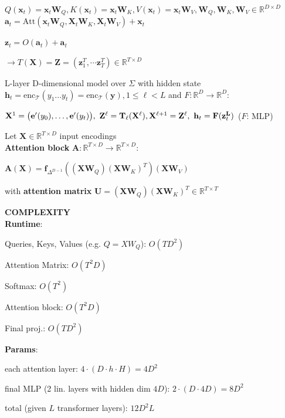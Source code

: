 $Q(\mathbf{x}_t) = \mathbf{x}_t \mathbf{W}_Q, K(\mathbf{x}_t) = \mathbf{x}_t \mathbf{W}_K, V(\mathbf{x}_t) = \mathbf{x}_t \mathbf{W}_V, \mathbf{W}_Q, \mathbf{W}_K, \mathbf{W}_V \in \mathbb{R}^{D\times D}$\\

$\textbf{a}_t = \text{Att}(\mathbf{x}_t \mathbf{W}_Q, \mathbf{X}_t \mathbf{W}_K, \mathbf{X}_t \mathbf{W}_V)  + \textbf{x}_t$

$\textbf{z}_t = O(\textbf{a}_t) + \textbf{a}_t$

$\rightarrow T(\textbf{X}) = \textbf{Z}= (\textbf{z}_1^T, \cdots \textbf{z}_T^T) \in \mathbb{R}^{T\times D}$

 L-layer D-dimensional model over \(\Sigma\) with hidden state \(\textbf{h}_t =\text{enc}_\mathcal{T}(y_1...y_t)=\text{enc}_\mathcal{T}(\textbf{y}), 1 \leq \ell < L\) and $F:\mathbb{R}^D\to\mathbb{R}^D$:

$\mathbf{X}^1 = \big( \mathbf{e}'(y_0), \dots, \mathbf{e}'(y_t) \big), \
\mathbf{Z}^\ell = \mathbf{T}_\ell(\mathbf{X}^\ell), \\
\mathbf{X}^{\ell+1} = \mathbf{Z}^\ell, \
\mathbf{h}_t = \mathbf{F}(\mathbf{z}_t^\mathbf{L})$ \quad \textcolor{mygray}{($F$: MLP)}


 Let \(\textbf{X}\in \mathbb{R}^{T\times D}\) input encodings\\
\textbf{Attention block} \(\mathbf{A}: \mathbb{R}^{T\times D}\to \mathbb{R}^{T\times D}\):

$\mathbf{A}(\mathbf{X}) = \textbf{f}_{\Delta^{D-1}} ((\mathbf{XW}_Q)(\mathbf{XW}_K)^T)(\mathbf{XW}_V)$

with \textbf{attention matrix} 
$\mathbf{U} = (\mathbf{X}\mathbf{W}_Q)(\mathbf{X}\mathbf{W}_K)^T \in \mathbb{R}^{T\times T}$



\textbf{COMPLEXITY} \\
\textbf{Runtime}: 
\begin{enumerate*}[label=\textbullet, itemjoin={\quad}]
    \item Queries, Keys, Values (e.g. $Q=XW_Q$): $O(TD^2)$
    \item Attention Matrix: $O(T^2D)$
    \item Softmax: $O(T^2)$
    \item Attention block: $O(T^2D)$
    \item Final proj.: $O(TD^2)$
\end{enumerate*}

\textbf{Params}:
\begin{enumerate*}[label=\textbullet, itemjoin={\quad}]
    \item each attention layer: $4\cdot(D\cdot h\cdot H) = 4D^2$
    \item final MLP (2 lin. layers with hidden dim $4D$): $2\cdot(D\cdot 4D) = 8D^2$
    \item total (given $L$ transformer layers): $12D^2L$
\end{enumerate*}


